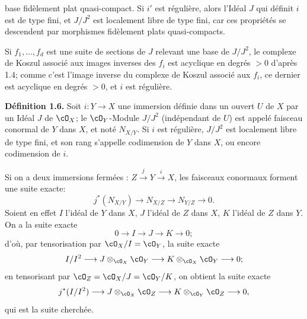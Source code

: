 base fidèlement plat quasi-compact. Si $i'$ est régulière, alors l'Idéal $J$ qui définit $i$ est de type fini, et $J/J^2$ est localement libre de type fini, car ces propriétés se descendent par morphismes fidèlement plats quasi-compacts.

Si $f_1,\ldots,f_d$ est une suite de sections de $J$ relevant une base de $J/J^2$, le complexe de Koszul associé aux images inverses des $f_i$ est acyclique en degrés $>0$ d'après 1.4; comme c'est l'image inverse du complexe de Koszul associé aux $f_i$, ce dernier est acyclique en degrés $>0$, et $i$ est régulière.

\textbf{Définition 1.6.} Soit $i:Y\longrightarrow X$ une immersion définie dans un ouvert $U$ de $X$ par un Idéal $J$ de $\cO_X$; le $\cO_Y$-Module $J/J^2$ (indépendant de $U$) est appelé faisceau conormal de $Y$ dans $X$, et noté $N_{X/Y}$. Si $i$ est régulière, $J/J^2$ est localement libre de type fini, et son rang s'appelle codimension de $Y$ dans $X$, ou encore codimension de $i$.

Si on a deux immersions fermées : $Z\xrightarrow{j}Y\xrightarrow{i}X$, les faisceaux conormaux forment une suite exacte:
\begin{equation}\tag{1.6.1}
 j^*(N_{X/Y})\longrightarrow N_{X/Z}\longrightarrow N_{Y/Z}\longrightarrow0.
\end{equation}
Soient en effet $I$ l'idéal de $Y$ dans $X$, $J$ l'idéal de $Z$ dans $X$, $K$ l'idéal de $Z$ dans $Y$. On a la suite exacte
\[
0\longrightarrow I\longrightarrow J\longrightarrow K\longrightarrow0;
\]
d'où, par tensorisation par $\cO_X/I=\cO_Y$, la suite exacte
\[
 I/I^2\longrightarrow J\otimes_{\cO_X}\cO_Y\longrightarrow K\otimes_{\cO_X}\cO_Y\longrightarrow0;
\]
en tensorisant par $\cO_Z=\cO_X/J=\cO_Y/K$, on obtient la suite exacte
\[
 j^*(I/I^2)\longrightarrow J\otimes_{\cO_X}\cO_Z\longrightarrow K\otimes_{\cO_Y}\cO_Z\longrightarrow0,
\]
qui est la suite cherchée.

